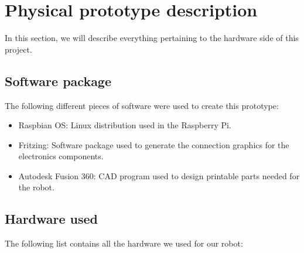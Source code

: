 
\section{Physical prototype description}
In this section, we will describe everything pertaining to the hardware side of this project.

\subsection{Software package}

The following different pieces of software were used to create this prototype:

\begin{itemize}
    \item Raspbian OS\cite{raspbian}: Linux distribution used in the Raspberry Pi.
    \item Fritzing\cite{fritzing}: Software package used to generate the connection graphics for the electronics components.
    \item Autodesk Fusion 360\cite{fusion360}: CAD program used to design printable parts needed for the robot.
\end{itemize}


    

\subsection{Hardware used}

The following list contains all the hardware we used for our robot:

